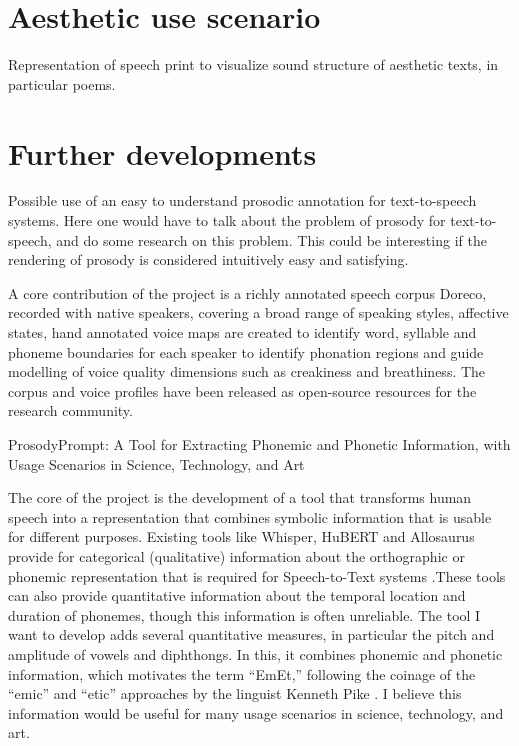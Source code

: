

\section{Aesthetic use scenario}

Representation of speech print to visualize sound structure of aesthetic texts, in particular poems. 

\section{Further developments}

Possible use of an easy to understand prosodic annotation for text-to-speech systems. Here one would have to talk about the problem of prosody for text-to-speech, and do some research on this problem. This could be interesting if the rendering of prosody is considered intuitively easy and satisfying. 





A core contribution of the project is a richly annotated speech corpus Doreco, recorded with native speakers, covering a broad range of speaking styles, affective states, hand annotated voice maps are created to identify word, syllable and phoneme boundaries for each speaker to identify phonation regions and guide modelling of voice quality dimensions such as creakiness and breathiness. The corpus and voice profiles have been released as open-source resources for the research community.


ProsodyPrompt: A Tool for Extracting Phonemic and Phonetic Information, with Usage Scenarios in Science, Technology, and Art

The core of the project is the development of a tool that transforms human speech into a representation that combines symbolic information that is usable for different purposes. Existing tools like Whisper, HuBERT and Allosaurus provide for categorical (qualitative) information about the orthographic or phonemic representation that is required for Speech-to-Text systems \cite{radford2023whisper,hsu2021hubert,li2020allosaurus}.These tools can also provide quantitative information about the temporal location and duration of phonemes, though this information is often unreliable. The tool I want to develop adds several quantitative measures, in particular the pitch and amplitude of vowels and diphthongs. In this, it combines phonemic and phonetic information, which motivates the term “EmEt,” following the coinage of the “emic” and “etic” approaches by the linguist Kenneth Pike \cite{pike1967language}. I believe this information would be useful for many usage scenarios in science, technology, and art.

